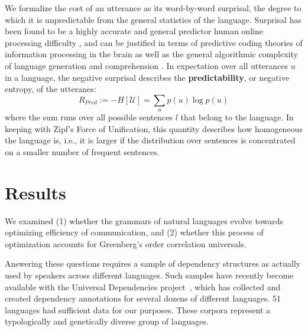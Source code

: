 \documentclass[9pt,twocolumn,twoside,lineno]{pnas-new}
\newcommand{\key}[1]{\textbf{#1}}
\begin{document}
We formalize the cost of an utterance as its word-by-word surprisal, the degree to which it is unpredictable from the general statistics of the language.
Surprisal has been found to be a highly accurate and general predictor human online processing difficulty \cite{hale2001probabilistic,levy2008expectation,smith2013effect}, and can be justified  in terms of predictive coding theories of information processing in the brain \cite{friston2009predictive} as well as the general algorithmic complexity of language generation and comprehension \cite{li2008introduction}.
In expectation over all utterances $u$ in a language, the negative surprisal describes the \key{predictability}, or negative entropy, of the utteranes: %
\begin{equation}
	R_{Pred} := - H[\mathcal{U}] = \sum_{u} p(u) \log p(u)
\end{equation}
where the sum runs over all possible sentences $l$ that belong to the language.
In keeping with Zipf's Force of Unification, this quantity describes how homogeneous the language is, i.e., it is larger if the distribution over sentences is concentrated on a smaller number of frequent sentences. %



\section{Results}

We examined 
(1) whether the grammars of natural languages evolve towards optimizing efficiency of communication, and
(2) whether this process of optimization accounts  for Greenberg's order correlation universals.

Answering these questions requires a sample of dependency structures as actually used by speakers across different languages.
Such samples have recently become available with the Universal Dependencies project~\cite{nivre2017universal}, which has collected and created dependency annotations for several dozens of different languages.
51 languages had sufficient data for our purposes. %
These corpora represent a typologically and genetically diverse group of languages.
\end{document}

